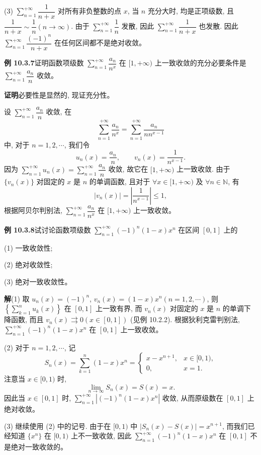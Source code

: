\documentclass[UTF8,12pt,a4paper,fontset=fandol]{ctexart}
\begin{document}
(3) $\sum\limits_{n=1}^{+\infty}\dfrac1{n+x}$ 对所有非负整数的点 $x$, 当 $n$ 充分大时, 均是正项级数, 且 $\dfrac1{n+x}\sim\dfrac1n(n\to\infty)$. 由于 $\sum\limits_{n=1}^{+\infty}\dfrac1n$ 发散, 因此 $\sum\limits_{n=1}^{+\infty}\dfrac1{n+x}$ 也发散. 因此 $\sum\limits_{n=1}^{+\infty}\dfrac{(-1)^n}{n+x}$ 在任何区间都不是绝对收敛。

\noindent\textbf{例 10.3.7}\quad 证明函数项级数 $\sum\limits_{n=1}^{+\infty}\dfrac{a_n}{n^x}$ 在 $[1,+\infty)$ 上一致收敛的充分必要条件是 $\sum\limits_{n=1}^{+\infty}\dfrac{a_n}{n}$ 收敛。

\noindent\textbf{证明}\quad 必要性是显然的, 现证充分性。

设 $\sum\limits_{n=1}^{+\infty}\dfrac{a_n}{n}$ 收敛, 在
\[
  \sum_{n=1}^{+\infty}\frac{a_n}{n^x}
  =\sum_{n=1}^{+\infty}\frac{a_n}{nn^{x-1}}
\]
中, 对于 $n=1,2,\cdots$, 我们令
\[
  u_n(x)=\frac{a_n}{n},\qquad v_n(x)=\frac1{n^{x-1}}.
\]
因为 $\sum\limits_{n=1}^{+\infty}u_n(x)=\sum\limits_{n=1}^{+\infty}\dfrac{a_n}{n}$ 收敛, 故它在 $[1,+\infty)$ 上一致收敛. 由于 $\{v_n(x)\}$ 对固定的 $x$ 是 $n$ 的单调函数, 且对于 $\forall x\in[1,+\infty)$ 及 $\forall n\in\mathbb N$, 有
\[
  |v_n(x)|=\left|\frac1{n^{x-1}}\right|\leq1,
\]
根据阿贝尔判别法, $\sum\limits_{n=1}^{+\infty}\dfrac{a_n}{n^x}$ 在 $[1,+\infty)$ 上一致收敛。

\noindent\textbf{例 10.3.8}\quad 试讨论函数项级数 $\sum\limits_{n=1}^{+\infty}(-1)^n(1-x)x^n$ 在区间 $[0,1]$ 上的

(1) 一致收敛性;

(2) 绝对收敛性;

(3) 绝对一致收敛性。

\noindent\textbf{解}\quad (1) 取 $u_n(x)=(-1)^n$, $v_n(x)=(1-x)x^n(n=1,2,\cdots)$, 则 $\left\{\sum\limits_{k=1}^n u_k(x)\right\}$ 在 $[0,1]$ 上一致有界, 而 $v_n(x)$ 对固定的 $x$ 是 $n$ 的单调下降函数, 而且 $v_n(x)\rightrightarrows0(x\in[0,1])$ (见例 10.2.2). 根据狄利克雷判别法, $\sum\limits_{n=1}^{+\infty}(-1)^n(1-x)x^n$ 在 $[0,1]$ 上一致收敛。

(2) 对于 $n=1,2,\cdots$, 记
\[
  S_n(x)=\sum_{k=1}^n(1-x)x^n=
  \begin{cases}
    x-x^{n+1}, & x\in[0,1),\\
    0, & x=1.
  \end{cases}
\]
注意当 $x\in[0,1)$ 时,
\[
  \lim_{n\to\infty}S_n(x)=S(x)=x.
\]
因此当 $x\in[0,1]$ 时, $\sum\limits_{n=1}^{+\infty}|(-1)^n(1-x)x^n|$ 收敛, 从而原级数在 $[0,1]$ 上绝对收敛。

(3) 继续使用 (2) 中的记号. 由于在 $[0,1)$ 中 $|S_n(x)-S(x)|=x^{n+1}$, 而我们已经知道 $\{x^n\}$ 在 $[0,1)$ 上不一致收敛, 因此 $\sum\limits_{n=1}^{+\infty}(-1)^n(1-x)x^n$ 在 $[0,1]$ 不是绝对一致收敛的。
\end{document}
